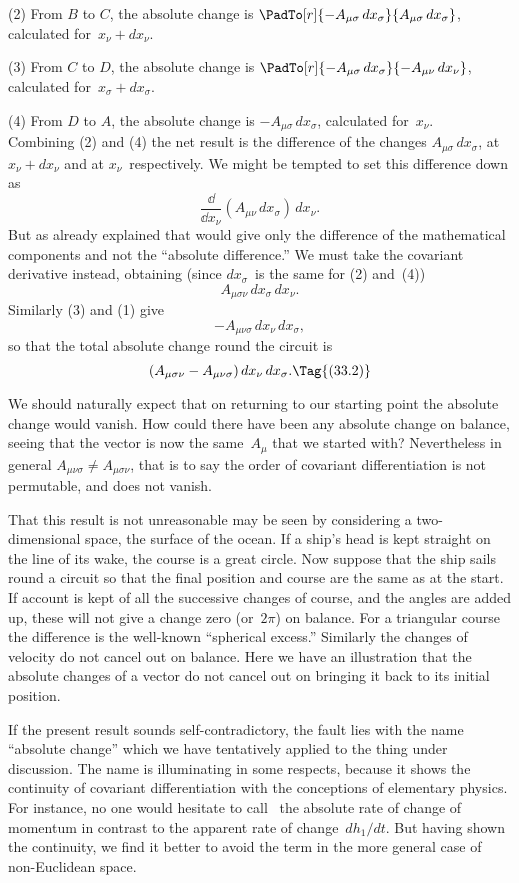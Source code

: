 \documentclass[12pt]{book}
\begin{document}
(2) From $B$ to $C$, the absolute change is $\PadTo[r]{-A_{\mu\sigma}\, dx_{\sigma}}{A_{\mu\sigma}\, dx_{\sigma}}$, calculated for~$x_{\nu} + dx_{\nu}$.

(3) From $C$ to $D$, the absolute change is $\PadTo[r]{-A_{\mu\sigma}\, dx_{\sigma}}{-A_{\mu\nu}\, dx_{\nu}}$, calculated for~$x_{\sigma} + dx_{\sigma}$.

(4) From $D$ to $A$, the absolute change is $-A_{\mu\sigma}\, dx_{\sigma}$, calculated for~$x_{\nu}$. \\
Combining (2) and (4) the net result is the difference of the changes $A_{\mu\sigma}\, dx_{\sigma}$,
at $x_{\nu} + dx_{\nu}$ and at $x_{\nu}$~respectively. We might be tempted to set this difference
down as
\[
\frac{\dd}{\dd x_{\nu}} (A_{\mu\nu}\, dx_{\sigma})\, dx_{\nu}.
\]
But as already explained that would give only the difference of the mathematical
components and not the ``absolute difference.'' We must take the
covariant derivative instead, obtaining (since $dx_{\sigma}$~is the same for (2) and~(4))
\[
A_{\mu\sigma\nu}\, dx_{\sigma}\, dx_{\nu}.
\]
Similarly (3) and (1) give
\[
-A_{\mu\nu\sigma}\, dx_{\nu}\, dx_{\sigma},
\]
so that the total absolute change round the circuit is
\[
(A_{\mu\sigma\nu} - A_{\mu\nu\sigma})\, dx_{\nu}\, dx_{\sigma}.
\Tag{(33.2)}
\]

We should naturally expect that on returning to our starting point the
absolute change would vanish. How could there have been any absolute change
on balance, seeing that the vector is now the same~$A_{\mu}$ that we started with?
Nevertheless in general $A_{\mu\nu\sigma} \neq A_{\mu\sigma\nu}$, that is to say the order of covariant
differentiation is not permutable, and  does not vanish.

That this result is not unreasonable may be seen by considering a two-dimensional
space, the surface of the ocean. If a ship's head is kept straight
on the line of its wake, the course is a great circle. Now suppose that the ship
sails round a circuit so that the final position and course are the same as at
the start. If account is kept of all the successive changes of course, and the
angles are added up, these will not give a change zero (or~$2\pi$) on balance. For
a triangular course the difference is the well-known ``spherical excess.'' Similarly
the changes of velocity do not cancel out on balance. Here we have an
illustration that the absolute changes of a vector do not cancel out on bringing
it back to its initial position.

If the present result sounds self-contradictory, the fault lies with the name
``absolute change'' which we have tentatively applied to the thing under discussion.
The name is illuminating in some respects, because it shows the
continuity of covariant differentiation with the conceptions of elementary
physics. For instance, no one would hesitate to call~ the absolute rate
of change of momentum in contrast to the apparent rate of change~$dh_{1}/dt$. But
having shown the continuity, we find it better to avoid the term in the more
general case of non-Euclidean space.
\end{document}
